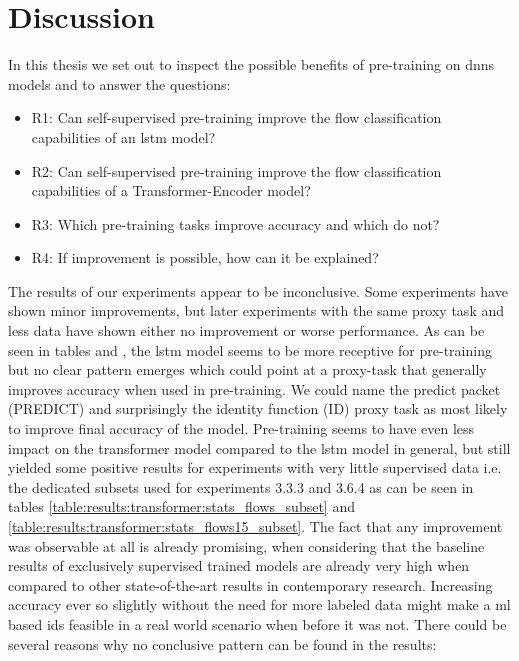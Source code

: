 \chapter{Discussion} \label{sec:discussion}

In this thesis we set out to inspect the possible benefits of pre-training on \glspl{dnn} models and to answer the questions:

\begin{itemize}
	\item R1: Can self-supervised pre-training improve the flow classification capabilities of an \gls{lstm} model?
	\item R2: Can self-supervised pre-training improve the flow classification capabilities of a Transformer-Encoder model?
	\item R3: Which pre-training tasks improve accuracy and which do not?
	\item R4: If improvement is possible, how can it be explained?
\end{itemize}

The results of our experiments appear to be inconclusive. Some experiments have shown minor improvements, but later experiments with the same proxy task and less data have shown either no improvement or worse performance. As can be seen in tables \label{table:discussion:lstm:improvement_results} and \label{table:discussion:transformer:improvement_results}, the \gls{lstm} model seems to be more receptive for pre-training but no clear pattern emerges which could point at a proxy-task that generally improves accuracy when used in pre-training. We could name the predict packet (PREDICT) and surprisingly the identity function (ID) proxy task as most likely to improve final accuracy of the model. Pre-training seems to have even less impact on the transformer model compared to the \gls{lstm} model in general, but still yielded some positive results for experiments with very little supervised data i.e. the dedicated subsets used for experiments 3.3.3 and 3.6.4 as can be seen in tables \ref{table:results:transformer:stats_flows_subset} and \ref{table:results:transformer:stats_flows15_subset}. The fact that any improvement was observable at all is already promising, when considering that the baseline results of exclusively supervised trained models are already very high when compared to other state-of-the-art results in contemporary research. Increasing accuracy ever so slightly without the need for more labeled data might make a \gls{ml} based \gls{ids} feasible in a real world scenario when before it was not. There could be several reasons why no conclusive pattern can be found in the results: \par

